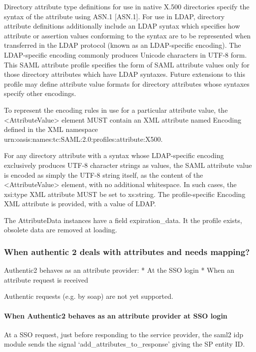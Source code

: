 \documentclass[letterpaper,10pt,english]{sphinxmanual}
\begin{document}
Directory attribute type definitions for use in native X.500 directories
specify the syntax of the attribute using ASN.1 {[}ASN.1{]}. For use in LDAP,
directory attribute definitions additionally include an LDAP syntax which
specifies how attribute or assertion values conforming to the syntax are to be
represented when transferred in the LDAP protocol (known as an LDAP-specific
encoding). The LDAP-specific encoding commonly produces Unicode characters in
UTF-8 form. This SAML attribute profile specifies the form of SAML attribute
values only for those directory attributes which have LDAP syntaxes. Future
extensions to this profile may define attribute value formats for directory
attributes whose syntaxes specify other encodings.

To represent the encoding rules in use for a particular attribute value, the
\textless{}AttributeValue\textgreater{} element MUST contain an XML attribute named Encoding defined
in the XML namespace urn:oasis:names:tc:SAML:2.0:profiles:attribute:X500.

For any directory attribute with a syntax whose LDAP-specific encoding
exclusively produces UTF-8 character strings as values, the SAML attribute
value is encoded as simply the UTF-8 string itself, as the content of the
\textless{}AttributeValue\textgreater{} element, with no additional whitespace.
In such cases, the xsi:type XML attribute MUST be set to xs:string.
The profile-specific Encoding XML attribute is provided, with a value of LDAP.

The AttributeData instances have a field expiration\_data. It the profile
exists, obsolete data are removed at loading.


\subsubsection{When authentic 2 deals with attributes and needs mapping?}
\label{attribute_management:when-authentic-2-deals-with-attributes-and-needs-mapping}
Authentic2 behaves as an attribute provider:
* At the SSO login
* When an attribute request is received

Authentic requests (e.g. by soap) are not yet supported.


\paragraph{When Authentic2 behaves as an attribute provider at SSO login}
\label{attribute_management:when-authentic2-behaves-as-an-attribute-provider-at-sso-login}
At a SSO request, just before responding to the service provider, the saml2
idp module sends the signal `add\_attributes\_to\_response' giving the SP entity
ID.
\end{document}

